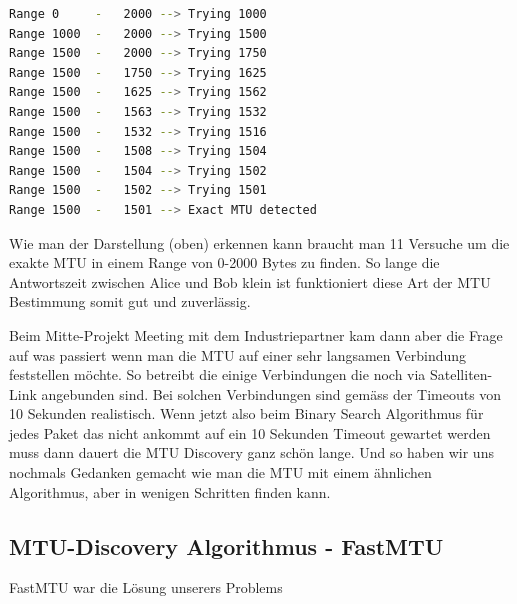 \begin{lstlisting}[language=bash, caption=MTU Discovery in Binary Search]                    
Range 0		-	2000 --> Trying 1000
Range 1000	-	2000 --> Trying 1500
Range 1500	-	2000 --> Trying 1750
Range 1500	-	1750 --> Trying 1625
Range 1500	-	1625 --> Trying 1562
Range 1500 	-	1563 --> Trying 1532
Range 1500	-	1532 --> Trying 1516
Range 1500	-	1508 --> Trying 1504
Range 1500	- 	1504 --> Trying 1502
Range 1500	-	1502 --> Trying 1501
Range 1500 	- 	1501 --> Exact MTU detected
\end{lstlisting}

Wie man der Darstellung (oben) erkennen kann braucht man 11 Versuche um die exakte \ac{MTU} in einem Range von 0-2000 Bytes zu finden. So lange die Antwortszeit zwischen Alice und Bob klein ist funktioniert diese Art der \ac{MTU} Bestimmung somit gut und zuverlässig.

Beim Mitte-Projekt Meeting mit dem Industriepartner kam dann aber die Frage auf was passiert wenn man die \ac{MTU} auf einer sehr langsamen Verbindung feststellen möchte. So betreibt die \osag einige Verbindungen die noch via Satelliten-Link angebunden sind. Bei solchen Verbindungen sind gemäss der \osag Timeouts von 10 Sekunden realistisch. Wenn jetzt also beim Binary Search Algorithmus für jedes Paket das nicht ankommt auf ein 10 Sekunden Timeout gewartet werden muss dann dauert die \ac{MTU} Discovery ganz schön lange. Und so haben wir uns nochmals Gedanken gemacht wie man die \ac{MTU} mit einem ähnlichen Algorithmus, aber in wenigen Schritten finden kann.

\subsection{MTU-Discovery Algorithmus - FastMTU}
FastMTU war die Lösung unserers Problems 














